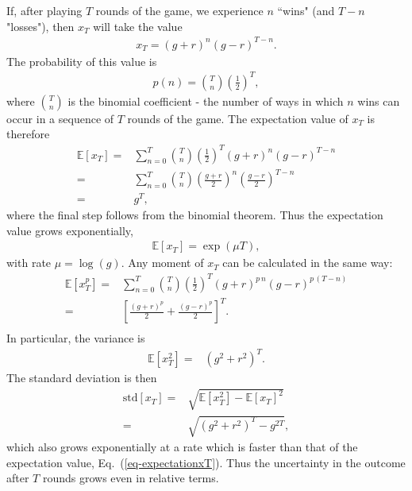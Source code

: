 \documentclass[11pt]{article}
\begin{document}
\begin{multicols}{2}
If, after playing $T$ rounds of the game, we experience $n$ ``wins" (and $T-n$ "losses"), then $x_T$ will take the value
\begin{align*}
x_T =  (g+r)^n (g-r)^{T-n}.
\end{align*}
The probability of this value is
\begin{align}
\label{eq:binomialDistr}
p(n) = {T \choose n} \left(\frac{1}{2}\right)^T,
\end{align}
where ${T \choose n}$ is the binomial coefficient -  the number of ways in which $n$ wins can occur in a sequence of $T$ rounds of the game.
The expectation value of $x_T$ is therefore
\begin{align}
\nonumber \mathbb{E}\left[x_T \right] =& \sum_{n=0}^T  {T \choose n} \left(\frac{1}{2}\right)^T (g+r)^n (g-r)^{T-n}\\
\nonumber =&  \sum_{n=0}^T  {T \choose n}  \left( \frac{g+r}{2}\right)^n  \left( \frac{g-r}{2}\right)^{T-n} \\
\label{eq-expectationxT}=& g^T,
\end{align}
where the final step follows from the binomial theorem.
Thus the expectation value grows exponentially,
\begin{align}
 \mathbb{E}\left[x_T \right]  = \exp(\mu T),
\end{align}
with rate $\mu = \log(g)$.
Any moment of $x_T$ can be calculated in the same way:
\begin{align}
\nonumber \mathbb{E}\left[x_T^p \right] =& \sum_{n=0}^T  {T \choose n} \left(\frac{1}{2}\right)^T (g+r)^{p\, n} (g-r)^{p\,(T-n)}\\
\nonumber =&  \left[\frac{(g+r)^p}{2}+  \frac{(g-r)^p}{2}\right]^T. \\
\end{align}
In particular, the variance is
\begin{align}
\nonumber \mathbb{E}\left[x_T^2 \right] =&   \left(g^2+r^2 \right)^T. 
\end{align}
The standard deviation is then
\begin{align}
\nonumber  \text{std}\left[ x_T\right] = & \sqrt{ \mathbb{E}\left[x_T^2 \right]  -  \mathbb{E}\left[x_T \right]^2 }\\
 = & \sqrt{ \left(g^2+r^2 \right)^T -g^{2 T}},
\end{align}
which also grows exponentially at a rate which is faster than that of the expectation value, Eq.~(\ref{eq-expectationxT}). Thus the uncertainty in the outcome after $T$ rounds grows even in relative terms.


\end{multicols}
\end{document}
